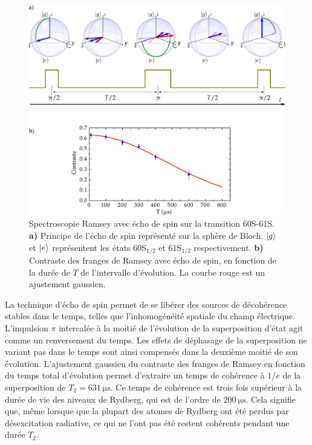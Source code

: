 \begin{figure}[!h]
\centering
\vspace{1em}
\includegraphics[width=.8\linewidth]{figures/setup/rydberg/spinEcho_60S61S}
\caption[Écho de spin 60S-61S]{
Spectroscopie Ramsey avec écho de spin sur la transition 60S-61S.
\textbf{a)} Principe de l'écho de spin représenté sur la sphère de Bloch. $\ket{g}$ et $\ket{e}$ représentent les états $\mathrm{60S_{1/2}}$ et $\mathrm{61S_{1/2}}$ respectivement.
\textbf{b)} Contraste des franges de Ramsey avec écho de spin, en fonction de la durée de $T$ de l'intervalle d'évolution. La courbe rouge est un ajustement gaussien.
}
\label{fig:spinEcho_60S61S}
\end{figure}
%
La technique d'écho de spin permet de se libérer des sources de décohérence stables dans le temps, telles que l'inhomogénéité spatiale du champ électrique.
L'impulsion $\pi$ intercalée à la moitié de l'évolution de la superposition d'état agit comme un renversement du temps.
Les effets de déphasage de la superposition ne variant pas dans le temps sont ainsi compensés dans la deuxième moitié de son évolution.
L'ajustement gaussien du contraste des franges de Ramsey en fonction du temps total d'évolution permet d'extraire un temps de cohérence à $1/e$ de la superposition de $T_2 = \SI{631}{\us}$.
Ce temps de cohérence est trois fois supérieur à la durée de vie des niveaux de Rydberg, qui est de l'ordre de $\SI{200}{\us}$.
Cela signifie que, même lorsque que la plupart des atomes de Rydberg ont été perdus par désexcitation radiative, ce qui ne l'ont pas été restent cohérents pendant une durée $T_2$.

